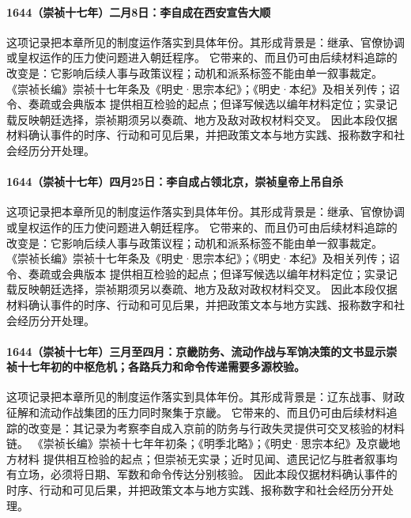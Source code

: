 \paragraph{1644（崇祯十七年）二月8日：李自成在西安宣告大顺} 这项记录把本章所见的制度运作落实到具体年份。其形成背景是：继承、官僚协调或皇权运作的压力使问题进入朝廷程序。 它带来的、而且仍可由后续材料追踪的改变是：它影响后续人事与政策议程；动机和派系标签不能由单一叙事裁定。 《崇祯长编》崇祯十七年条及《明史·思宗本纪》；《明史·本纪》及相关列传；诏令、奏疏或会典版本 提供相互检验的起点；但译写候选以编年材料定位；实录记载反映朝廷选择，崇祯期须另以奏疏、地方及敌对政权材料交叉。 因此本段仅据材料确认事件的时序、行动和可见后果，并把政策文本与地方实践、报称数字和社会经历分开处理。

\paragraph{1644（崇祯十七年）四月25日：李自成占领北京，崇祯皇帝上吊自杀} 这项记录把本章所见的制度运作落实到具体年份。其形成背景是：继承、官僚协调或皇权运作的压力使问题进入朝廷程序。 它带来的、而且仍可由后续材料追踪的改变是：它影响后续人事与政策议程；动机和派系标签不能由单一叙事裁定。 《崇祯长编》崇祯十七年条及《明史·思宗本纪》；《明史·本纪》及相关列传；诏令、奏疏或会典版本 提供相互检验的起点；但译写候选以编年材料定位；实录记载反映朝廷选择，崇祯期须另以奏疏、地方及敌对政权材料交叉。 因此本段仅据材料确认事件的时序、行动和可见后果，并把政策文本与地方实践、报称数字和社会经历分开处理。

\paragraph{1644（崇祯十七年）三月至四月：京畿防务、流动作战与军饷决策的文书显示崇祯十七年初的中枢危机；各路兵力和命令传递需要多源校验。} 这项记录把本章所见的制度运作落实到具体年份。其形成背景是：辽东战事、财政征解和流动作战集团的压力同时聚集于京畿。 它带来的、而且仍可由后续材料追踪的改变是：其记录为考察李自成入京前的防务与行政失灵提供可交叉核验的材料链。 《崇祯长编》崇祯十七年年初条；《明季北略》；《明史·思宗本纪》及京畿地方材料 提供相互检验的起点；但崇祯无实录；近时见闻、遗民记忆与胜者叙事均有立场，必须将日期、军数和命令传达分别核验。 因此本段仅据材料确认事件的时序、行动和可见后果，并把政策文本与地方实践、报称数字和社会经历分开处理。

